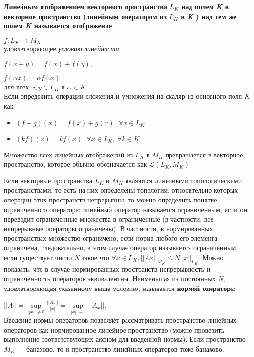 \documentclass[12pt,a4paper]{article}
\begin{document}
\bfseries Линейным отображением \mdseries векторного пространства  $L_K$  над полем {\it K} в векторное пространство  (линейным оператором из $L_K$   в {\it K} ) над тем же полем {\it K}  называется отображение

$f:L_K\rightarrow M_K,$\\
удовлетворяющее {\it условию линейности}

$f(x+y)=f(x)+f(y),$
 
$f(\alpha x)= \alpha f(x)$\\
для всех $x, y \in L_K$ и $\alpha \in K$\\

Если определить операции сложения и умножения на скаляр из основного поля {\it K} как
\begin{itemize}
\item $(f+g)(x)=f(x)+g(x)~~~\forall x \in L_K$
\item $(kf)(x)=kf(x)~~~\forall x \in L_K,~\forall k \in K $
\end{itemize}
\par Множество всех линейных отображений из $L_K$ в $M_K$ превращается в векторное пространство,
которое обычно обозначается как $\mathcal{L}(L_K, M_K)$ 

Если векторные пространства $L_K$ и $M_K$ являются линейными топологическими пространствами, то есть на них определены топологии, относительно которых операции этих пространств непрерывны, то можно определить понятие ограниченного оператора: линейный оператор называется ограниченным, если он переводит ограниченные множества в ограниченные (в частности, все непрерывные операторы ограничены). В частности, в нормированных пространствах множество ограничено, если норма любого его элемента ограничена, следовательно, в этом случае оператор называется ограниченным, если существует число {\it N} такое что
$\forall x \in L_K, ||Ax||_{M_K} \leqslant N||x||_{L_K}$.
Можно показать, что в случае нормированных пространств непрерывность и ограниченность операторов эквивалентны. Наименьшая из постоянных {\it N}, удовлетворяющая указанному выше условию, называется {\bf нормой оператора}:

$||A|| = \sup\limits_{||x|| \neq 0}{\frac{||A_x ||}{||x||}} = \sup\limits_{||x||=1}{||A_x ||}.$\\

Введение нормы операторов позволяет рассматривать пространство линейных операторов как нормированное линейное пространство (можно проверить выполнение соответствующих аксиом для введенной нормы). Если пространство $M_K$  — банахово, то и пространство линейных операторов тоже банахово.
\end{document}
